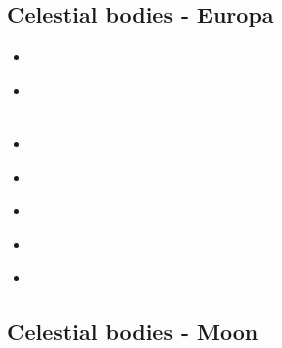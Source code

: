 \subsection{Celestial bodies - Europa}

\begin{scriptsize}
\begin{itemize}
\item[\twothousandfour] 
\textcite{shha04} \\
\item[\twothousandfive] 
\textcite{shha05} \\
\textcite{mish05} \\
\item[\twothousandeight] 
\textcite{hash08} \\
\item[\twothousandten] 
\textcite{hash10} \\
\item[\twothousandeleven] 
\textcite{hash11} \\
\item[\twothousandfourteen] 
\textcite{kast14} \\
\item[\twothousandnineteen] 
\textcite{almc19} \\
\end{itemize}
\end{scriptsize}

\subsection{Celestial bodies - Moon}

